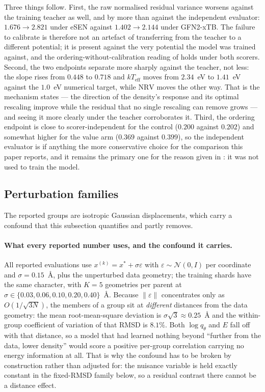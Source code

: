 Three things follow. First, the raw normalised residual variance worsens against the
training teacher as well, and by more than against the independent evaluator: $1.676
\to 2.821$ under eSEN against $1.402 \to 2.144$ under GFN2-xTB. The failure to
calibrate is therefore not an artefact of transferring from the teacher to a different
potential; it is present against the very potential the model was trained against, and
the ordering-without-calibration reading of  holds under both scorers.
Second, the two endpoints separate more sharply against the teacher, not less: the
slope rises from $0.448$ to $0.718$ and $kT_{\mathrm{eff}}$ moves from $2.34$~eV to
$1.41$~eV against the $1.0$~eV numerical target, while $\mathrm{NRV}$ moves the other
way. That is the mechanism  states --- the direction of the density's
response and its optimal rescaling improve while the residual that no single rescaling
can remove grows --- and seeing it more clearly under the teacher corroborates it.
Third, the ordering endpoint is close to scorer-independent for the control ($0.200$
against $0.202$) and somewhat higher for the value arm ($0.369$ against $0.399$), so
the independent evaluator is if anything the more conservative choice for the
comparison this paper reports, and it remains the primary one for the reason given in
: it was not used to train the model.

\subsection{Perturbation families}
\label{app:perturb}

The reported groups are isotropic Gaussian displacements, which carry a confound that
this subsection quantifies and partly removes.

\paragraph{What every reported number uses, and the confound it carries.} All reported
evaluations use $x^{(k)} = x^{*} + \sigma\varepsilon$ with
$\varepsilon \sim \mathcal{N}(0,I)$ per coordinate and $\sigma = 0.15$~\AA{}, plus the
unperturbed data geometry; the training shards have the same character, with $K = 5$
geometries per parent at $\sigma \in \{0.03,0.06,0.10,0.20,0.40\}$~\AA{}. Because
$\lVert\varepsilon\rVert$ concentrates only as $O(1/\sqrt{3N})$, the members of a group
sit at \emph{different} distances from the data geometry: the mean root-mean-square
deviation is $\sigma\sqrt{3} \approx 0.25$~\AA{} and the within-group coefficient of
variation of that RMSD is $8.1\%$. Both $\log q_\theta$ and $E$ fall off with that
distance, so a model that had learned nothing beyond ``further from the data, lower
density'' would score a positive per-group correlation carrying no energy information
at all. That is why the confound has to be broken by construction rather than adjusted
for: the nuisance variable is held exactly constant in the fixed-RMSD family below, so
a residual contrast there cannot be a distance effect.

